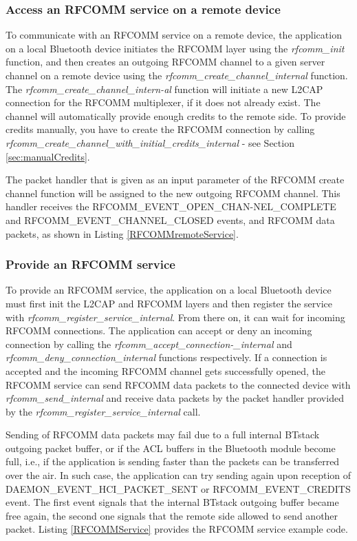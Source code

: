 \subsubsection{Access an RFCOMM service on a remote device}

To communicate with an RFCOMM service on a remote device, the application on a local Bluetooth device initiates the RFCOMM layer using the \emph{rfcomm\_init} function, and then creates an outgoing RFCOMM channel to a given server channel on a remote device using the \emph{rfcomm\_create\_channel\_internal} function. The  \emph{rfcomm\_create\_channel\_intern-al} function will initiate a new L2CAP connection for the RFCOMM multiplexer, if it does not already exist. The channel will automatically provide enough credits to the remote side. To provide credits manually, you have to create the RFCOMM connection by calling \emph{rfcomm\_create\_channel\_with\_initial\_credits\_internal} - see Section \ref{sec:manualCredits}.


The packet handler that is given as an input parameter of the RFCOMM create channel function will be assigned to the new outgoing \mbox{RFCOMM} channel. This handler receives the RFCOMM\_EVENT\_OPEN\_CHAN-NEL\_COMPLETE and RFCOMM\_EVENT\_CHANNEL\_CLOSED events, and RFCOMM data packets, as shown in Listing \ref{RFCOMMremoteService}.

\subsubsection{Provide an RFCOMM service}
\label{section:rfcomm_service}

To provide an RFCOMM service, the application on a local Bluetooth device must first init the L2CAP and RFCOMM layers and then register the service with \emph{rfcomm\_register\_service\_internal}. From there on, it can wait for incoming RFCOMM connections. The application can accept or deny an incoming connection by calling the \emph{rfcomm\_accept\_connection-\_internal} and \emph{rfcomm\_deny\_connection\_internal} functions respectively. If a connection is accepted and the incoming RFCOMM channel gets successfully opened, the RFCOMM service can send RFCOMM data packets to the connected device with \emph{rfcomm\_send\_internal} and receive data packets by the packet handler provided by the \emph{rfcomm\_register\_service\_internal} call.

Sending of RFCOMM data packets may fail due to a full internal BTstack outgoing packet buffer, or if the ACL buffers in the Bluetooth module become full, i.e., if the application is sending faster than the packets can be transferred over the air. In such case, the application can try sending again upon reception of DAEMON\_EVENT\_HCI\_PACKET\_SENT or RFCOMM\_EVENT\_CREDITS event. The first event signals that the internal BTstack outgoing buffer became free again, the second one signals that the remote side allowed to send another  packet. Listing \ref{RFCOMMService} provides the RFCOMM service example code.

